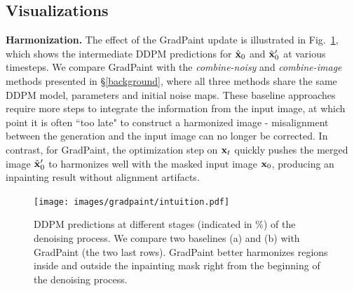 





\subsection{Visualizations}

\noindent \textbf{Harmonization.} The effect of the GradPaint update is illustrated in Fig.~\ref{fig:intuition}, 
which shows the intermediate \ac{DDPM} predictions for $\hat{\mathbf{x}}_0$ and $\hat{\mathbf{x}}_0'$ at various timesteps. We 
compare GradPaint with the \textit{combine-noisy} and \textit{combine-image} methods presented in \S\ref{background}, where all three methods share the same DDPM model, parameters and initial noise maps.
These baseline approaches require more steps to integrate the information from the input image, at which point it is often ``too late" to construct a harmonized image - misalignment between the generation and the input image can no longer be corrected. In contrast, for GradPaint, the optimization step on $\mathbf{x}_t$ quickly pushes the merged image $\hat{\mathbf{x}}_0'$ to harmonizes well with the masked input image $\mathbf{x}_0$, producing an inpainting result without alignment artifacts.

  

\begin{figure}[htbp]
  \centering
    \texttt{[image: images/gradpaint/intuition.pdf]}
    \caption{\ac{DDPM} predictions at different stages (indicated in $\%$) of the denoising process. We compare two baselines (a) and (b) with GradPaint (the two last rows). GradPaint better harmonizes regions inside and outside the inpainting mask right from the beginning of the denoising process.}
    \label{fig:intuition}
\end{figure}

